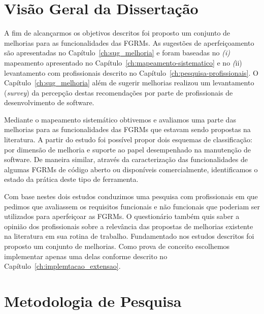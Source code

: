 
\section{Visão Geral da Dissertação}
\label{sec:intro-visao-geral}

A fim de alcançarmos os objetivos descritos foi proposto um conjunto de
melhorias para as funcionalidades das FGRMs. As sugestões de aperfeiçoamento
são apresentadas no Capítulo~\ref{ch:sug_melhoria} e foram baseadas no
\textit{(i)} mapeamento apresentado no Capítulo~\ref{ch:mapeamento-sistematico}
e no \textit(ii) levantamento com profissionais descrito no
Capítulo~\ref{ch:pesquisa-profissionais}. O Capítulo~\ref{ch:sug_melhoria} além
de sugerir melhorias realizou um levantamento (\textit{survey}) da percepção
destas recomendações por parte de profissionais de desenvolvimento de software.

Mediante o mapeamento sistemático obtivemos e avaliamos uma parte das melhorias
para as funcionalidades das FGRMs que estavam sendo propostas na literatura. A
partir do estudo foi possível propor dois esquemas de classificação: por
dimensão de melhoria e suporte ao papel desempenhado na manutenção de software.
De maneira similar, através da caracterização das funcionalidades de algumas
FGRMs de código aberto ou disponíveis comercialmente, identificamos o estado da
prática deste tipo de ferramenta.

Com base nestes dois estudos conduzimos uma pesquisa com profissionais em que
pedimos que avaliassem os requisitos funcionais e não funcionais que poderiam
ser utilizados para aperfeiçoar as FGRMs. O questionário também quis saber a
opinião dos profissionais sobre a relevância das propostas de me\-lho\-ri\-as
existente na literatura em sua rotina de trabalho. Fundamentado nos estudos
descritos foi proposto um conjunto de melhorias. Como prova de conceito
escolhemos implementar apenas uma delas conforme descrito no
Capítulo~\ref{ch:implemtacao_extensao}.

\section{Metodologia de Pesquisa}
\label{sec:intro-metodologia}

